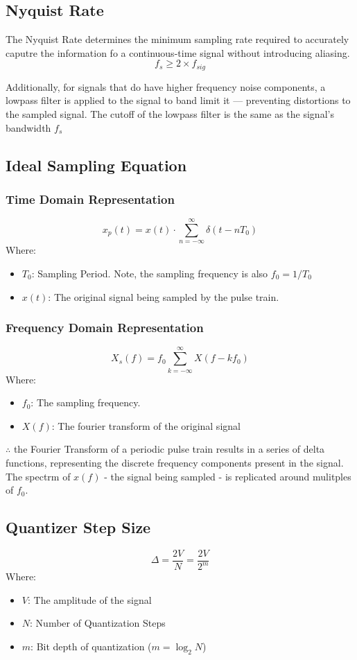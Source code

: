 \documentclass[10pt]{article}
\begin{document}
\subsection{Nyquist Rate}
The Nyquist Rate determines the minimum sampling rate required to accurately caputre the information fo a continuous-time signal without introducing aliasing.
\[
    f_s \ge 2 \times f_{sig}
\]

Additionally, for signals that do have higher frequency noise components, a lowpass filter is applied to the signal to band limit it --- preventing distortions to the sampled signal. The cutoff of the lowpass filter is the same as the signal's bandwidth $f_s$

\subsection{Ideal Sampling Equation}
\subsubsection{Time Domain Representation}
\[
    x_p(t) = x(t) \cdot \sum_{n=-\infty}^{\infty}\delta{\left(t-nT_0\right)}
\]
\noindent Where:
\begin{itemize}
    \item $T_0$: Sampling Period. Note, the sampling frequency is also $f_0=1/T_0$
    \item $x(t)$: The original signal being sampled by the pulse train.
\end{itemize}
\subsubsection{Frequency Domain Representation}
\[
    X_s(f) = f_0 \sum_{k=-\infty}^{\infty} X(f-k f_0)
\]
\noindent Where:
\begin{itemize}
    \item $f_0$: The sampling frequency.
    \item $X(f)$: The fourier transform of the original signal
\end{itemize}

\noindent $\therefore$ the Fourier Transform of a periodic pulse train results in a series of delta functions, representing the discrete frequency components present in the signal. The spectrm of $x(f)$ - the signal being sampled - is replicated around mulitples of $f_0$.

\subsection{Quantizer Step Size}
\[
    \Delta = \frac{2V}{N} = \frac{2V}{2^m}
\]
\noindent Where:
\begin{itemize}
    \item $V$: The amplitude of the signal
    \item $N$: Number of Quantization Steps
    \item $m$: Bit depth of quantization ($m=\log_2{N}$)
\end{itemize}
\end{document}
